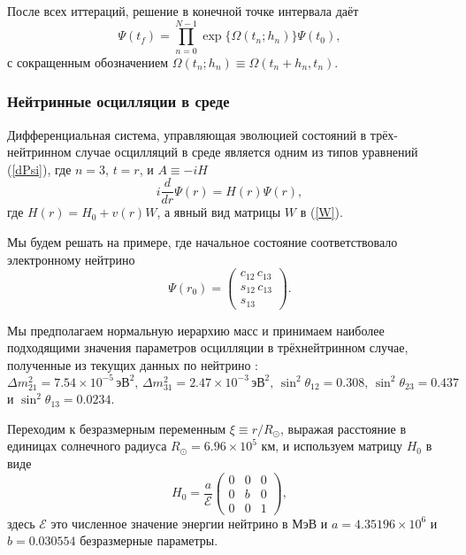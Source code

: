 \documentclass[12pt]{article}
\numberwithin{equation}{section}
\begin{document}
После всех иттераций, решение в конечной точке интервала даёт
\begin{equation}
\Psi(t_f)=\prod\limits_{n=0}^{N-1} \exp\{\Omega(t_n;h_n)\}\Psi(t_0),
\end{equation}
с сокращенным обозначением $\Omega(t_n;h_n)\equiv \Omega(t_n + h_n,t_n)$.

\subsubsection{Нейтринные осцилляции в среде}

Дифференциальная система, управляющая эволюцией состояний в трёх-нейтринном случае осцилляций в среде является одним из типов уравнений (\ref{dPsi}), где $n=3$, $t=r$, и $A\equiv -iH$
\begin{equation}
i\frac{d}{dr}\Psi(r)=H(r)\Psi(r),
\end{equation}
где $H(r)=H_0 + v(r)W$, а явный вид матрицы $W$ в (\ref{W}).

Мы будем решать на примере, где начальное состояние соответствовало электронному нейтрино
\begin{equation}
\Psi(r_0)=
\begin{pmatrix}
c_{12}\, c_{13}\\
s_{12}\, c_{13}\\
s_{13} 
\end{pmatrix}.
\end{equation}

Мы предполагаем нормальную иерархию масс и принимаем наиболее подходящими значения параметров осцилляции в трёхнейтринном случае, полученные из текущих данных по нейтрино %
: $\Delta m^2_{21}=7.54\times 10^{-5}\, \text{эВ}^2,\, \Delta m^2_{31}=2.47 \times 10^{-3}\, \text{эВ}^2,\, \sin^2\theta_{12}=0.308,\, \sin^2\theta_{23}=0.437$ и $\sin^2\theta_{13}=0.0234$.

Переходим к безразмерным переменным $\xi\equiv r/R_\odot$, выражая расстояние в единицах солнечного радиуса $R_\odot=6.96\times10^5$ км, и используем матрицу $H_0$ в виде
\begin{equation}
H_0=\frac{a}{\mathcal{E}}
  \begin{pmatrix}
  0& 0& 0\\
  0& b& 0\\
  0& 0& 1 
  \end{pmatrix},
\end{equation}
здесь $\mathcal{E}$ это численное значение энергии нейтрино в МэВ и $a=4.35196\times 10^6$ и $b=0.030554$ безразмерные параметры.
\end{document}
